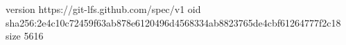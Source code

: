 version https://git-lfs.github.com/spec/v1
oid sha256:2e4c10c72459f63ab878e6120496d4568334ab8823765de4cbf61264777f2c18
size 5616
